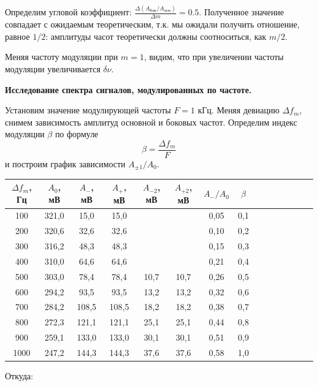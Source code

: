 \documentclass[14pt]{article}
\begin{document}
\vspace{1cm}
Определим угловой коэффициент: $\frac{\Delta(A_{\text{бок}}/A_{\text{осн}})}{\Delta m} = 0.5$. Полученное значение совпадает с ожидаемым теоретическим, т.к. мы ожидали получить отношение, равное $1/2$: амплитуды часот теоретически должны соотноситься, как $m/2$.

Меняя частоту модуляции при $m = 1$, видим, что при увеличении частоты модуляции увеличивается $\delta\nu$. 

\newpage
\textbf{Исследование спектра сигналов, модулированных по частоте.}

Установим значение модулирующей частоты $F = 1$ кГц. Меняя девиацию $\Delta f_m$, снимем зависимость амплитуд основной и боковых частот. Определим индекс модуляции $\beta$ по формуле
$$
	\beta = \frac{\Delta f_m}{F}
$$
\noindent и построим график зависимости $A_{\pm1}/A_0$.

\vspace{1cm}
\begin{center}
\begin{tabular}{|c|c|c|c|c|c|c|c|c|c|c|c|c|c|c|}
\hline
$\Delta f_m$, Гц&$A_0$, мВ&$A_-$, мВ&$A_+$, мВ&$A_{-2}$, мВ&$A_{+2}$, мВ&$A_-/A_0$&$\beta$\\
\hline
100&321,0&15,0&15,0&&&0,05&0,1\\
\hline
200&320,6&32,6&32,6&&&0,10&0,2\\
\hline
300&316,2&48,3&48,3&&&0,15&0,3\\
\hline
400&310,0&64,6&64,6&&&0,21&0,4\\
\hline
500&303,0&78,4&78,4&10,7&10,7&0,26&0,5\\
\hline
600&294,2&93,5&93,5&13,2&13,2&0,32&0,6\\
\hline
700&284,2&108,5&108,5&18,2&18,2&0,38&0,7\\
\hline
800&272,3&121,1&121,1&25,1&25,1&0,44&0,8\\
\hline
900&259,1&133,0&133,0&30,1&30,1&0,51&0,9\\
\hline
1000&247,2&144,3&144,3&37,6&37,6&0,58&1,0\\
\hline
\end{tabular}
\end{center}

\vspace{1cm}
Откуда:
\end{document}
